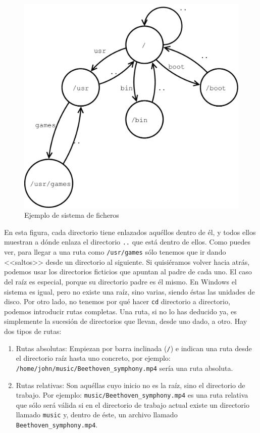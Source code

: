 \documentclass[a4paper]{article}
\begin{document}
\begin{figure}[H]
    \includegraphics[width=\linewidth]{filesystems}
    \caption{Ejemplo de sistema de ficheros}
    \label{img:extensions}
\end{figure}

En esta figura, cada directorio tiene enlazados aquéllos dentro de él, y todos
ellos muestran a dónde enlaza el directorio \verb!..! que está dentro de ellos.
Como puedes ver, para llegar a una ruta como \verb!/usr/games! sólo tenemos
que ir dando <<saltos>> desde un directorio al siguiente. Si quisiéramos
volver hacia atrás, podemos usar los directorios ficticios que apuntan al padre
de cada uno. El caso del raíz es especial, porque su directorio padre es él
mismo. En Windows el sistema es igual, pero no existe una raíz, sino varias,
siendo éstas las unidades de disco. Por otro lado, no tenemos por qué hacer
\verb!cd! directorio a directorio, podemos introducir rutas completas. Una ruta,
si no lo has deducido ya, es simplemente la sucesión de directorios que llevan,
desde uno dado, a otro. Hay dos tipos de rutas:
\begin{enumerate}
\item Rutas absolutas: Empiezan por barra inclinada (\verb!/!) e indican una
ruta desde el directorio raíz hasta uno concreto, por ejemplo:
\verb!/home/john/music/Beethoven_symphony.mp4! sería una ruta absoluta.
\item Rutas relativas: Son aquéllas cuyo inicio no es la raíz, sino el
directorio de trabajo. Por ejemplo: \verb!music/Beethoven_symphony.mp4! es una
ruta relativa que sólo será válida si en el directorio de trabajo actual existe
un directorio llamado \verb!music! y, dentro de éste, un archivo llamado
\verb!Beethoven_symphony.mp4!.
\end{enumerate}
\end{document}
